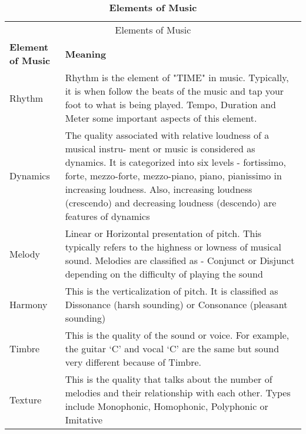 \renewcommand{\arraystretch}{2}
\centering
\setlength{\arrayrulewidth}{0.3mm}
\begin{table}[H]
\small
\begin{center}
\begin{tabular}{ | p{2cm}| p{11cm}| }
\multicolumn{2}{c}{Elements of Music \cite{martineau2021elements}} \\
\cline{1-2}
\textbf{Element of Music} & \textbf{Meaning} \\
\hline  \hline
Rhythm          &  Rhythm is the element of "TIME" in music. Typically, it is when follow the beats of the music and tap your foot to what is being played. Tempo, Duration and Meter some important aspects of this element.  \\
\hline
Dynamics        &  The quality associated with relative loudness of a musical instru-
ment or music is considered as dynamics. It is categorized into six levels -  fortissimo, forte, mezzo-forte, mezzo-piano, piano, pianissimo in increasing loudness.  Also, increasing loudness (crescendo) and decreasing loudness (descendo) are features of dynamics  \\
\hline
Melody          & Linear or Horizontal presentation of pitch. This typically refers to the highness or lowness of musical sound. Melodies are classified as - Conjunct or Disjunct depending on the difficulty of playing the sound \\
\hline
Harmony         &        This is the verticalization of pitch. It is classified as  Dissonance  (harsh sounding) or Consonance (pleasant sounding) \\
\hline
Timbre          &         This is the quality of the sound or voice. For example, the guitar ‘C’ and vocal ‘C’ are the same but sound very different because of Timbre.                                \\
\hline
Texture        &       This is the quality that talks about the number of melodies and their relationship with each other. Types include  Monophonic, Homophonic, Polyphonic or Imitative  \\
 \hline  \hline
\end{tabular} 
\caption{\label{elements-of-music} \textbf{Elements of Music}}
\end{center}
\end{table}
